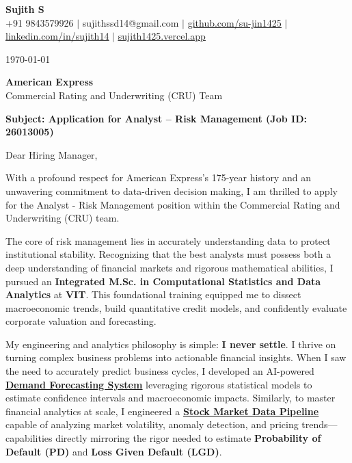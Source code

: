 \documentclass[a4paper,11pt]{article}
\newcommand{\ulink}[2]{\href{#1}{\uline{#2}}}
\begin{document}
\pagestyle{empty}

\begin{center}
{\color[HTML]{000000}\fontsize{30}{35}\selectfont\bfseries Sujith S} \\[5pt]
{\fontsize{10.5}{12.5}\selectfont\textcolor[HTML]{3A3A3A}{+91 9843579926 $|$ sujithssd14@gmail.com $|$ \ulink{https://github.com/su-jin1425}{github.com/su-jin1425} $|$ \ulink{https://linkedin.com/in/sujith14}{linkedin.com/in/sujith14} $|$ \ulink{https://sujith1425.vercel.app}{sujith1425.vercel.app}}}
\end{center}

\vspace{10pt}

\today

\textbf{American Express} \\
Commercial Rating and Underwriting (CRU) Team

\textbf{Subject: Application for Analyst -- Risk Management (Job ID: 26013005)}

Dear Hiring Manager,

With a profound respect for American Express's 175-year history and an unwavering commitment to data-driven decision making, I am thrilled to apply for the Analyst - Risk Management position within the Commercial Rating and Underwriting (CRU) team.

The core of risk management lies in accurately understanding data to protect institutional stability. Recognizing that the best analysts must possess both a deep understanding of financial markets and rigorous mathematical abilities, I pursued an \textbf{Integrated M.Sc. in Computational Statistics and Data Analytics} at \textbf{VIT}. This foundational training equipped me to dissect macroeconomic trends, build quantitative credit models, and confidently evaluate corporate valuation and forecasting.

My engineering and analytics philosophy is simple: \textbf{I never settle}. I thrive on turning complex business problems into actionable financial insights. When I saw the need to accurately predict business cycles, I developed an AI-powered \ulink{https://github.com/su-jin1425/Demand-Forecasting-System}{\textbf{Demand Forecasting System}} leveraging rigorous statistical models to estimate confidence intervals and macroeconomic impacts. Similarly, to master financial analytics at scale, I engineered a \ulink{https://github.com/su-jin1425/Real-Time-Stock-Market-Data-Pipeline}{\textbf{Stock Market Data Pipeline}} capable of analyzing market volatility, anomaly detection, and pricing trends---capabilities directly mirroring the rigor needed to estimate \textbf{Probability of Default (PD)} and \textbf{Loss Given Default (LGD)}.
\end{document}
